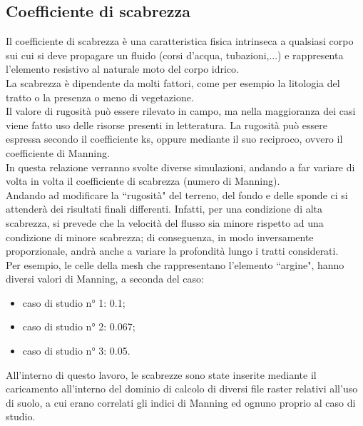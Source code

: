 \subsection{Coefficiente di scabrezza}
Il coefficiente di scabrezza è una caratteristica fisica intrinseca a qualsiasi corpo sui cui si deve propagare un fluido (corsi d'acqua, tubazioni,...) e rappresenta l'elemento resistivo al naturale moto del corpo idrico.\\
La scabrezza è dipendente da molti fattori, come per esempio la litologia del tratto o la presenza o meno di vegetazione.\\
Il valore di rugosità può essere rilevato in campo, ma nella maggioranza dei casi viene fatto uso delle risorse presenti in letteratura. La rugosità può essere espressa secondo il coefficiente ks, oppure mediante il suo reciproco, ovvero il coefficiente di Manning.\\
In questa relazione verranno svolte diverse simulazioni, andando a far variare di volta in volta il coefficiente di scabrezza (numero di Manning).\\
Andando ad modificare la ``rugosità" del terreno, del fondo e delle sponde ci si attenderà dei risultati finali differenti. Infatti, per una condizione di alta scabrezza, si prevede che la velocità del flusso sia minore rispetto ad una condizione di minore scabrezza; di conseguenza, in modo inversamente proporzionale, andrà anche a variare la profondità lungo i tratti considerati.\\
Per esempio, le celle della mesh che rappresentano l'elemento ``argine", hanno diversi valori di Manning, a seconda del caso:
\begin{itemize}
    \item caso di studio n° 1: 0.1;
    \item caso di studio n° 2: 0.067;
    \item caso di studio n° 3: 0.05.
\end{itemize}
All'interno di questo lavoro, le scabrezze sono state inserite mediante il caricamento all'interno del dominio di calcolo di diversi file raster relativi all'uso di suolo, a cui erano correlati gli indici di Manning ed ognuno proprio al caso di studio.

